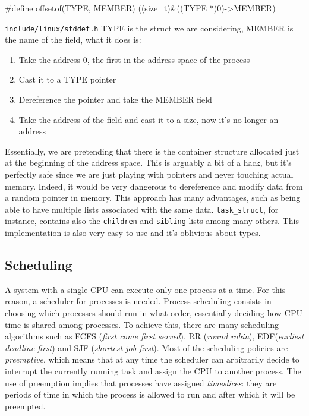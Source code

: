 \documentclass[10pt]{book}
\begin{document}
\begin{code}
#define offsetof(TYPE, MEMBER) ((size_t)&((TYPE *)0)->MEMBER)
\end{code}
\verb|include/linux/stddef.h|
TYPE is the struct we are considering, MEMBER is the name of the field, what it does is:
\begin{enumerate}
    \item Take the address 0, the first in the address space of the process
    \item Cast it to a TYPE pointer 
    \item Dereference the pointer and take the MEMBER field
    \item Take the address of the field and cast it to a size, now it's no longer an address
\end{enumerate}
Essentially, we are pretending that there is the container structure allocated just at the beginning of the address space. This is arguably a bit of a hack, but it's perfectly safe since we are just playing with pointers and never touching actual memory. Indeed, it would be very dangerous to dereference and modify data from a random pointer in memory. This approach has many advantages, such as being able to have multiple lists associated with the same data. \verb|task_struct|, for instance, contains also the \verb|children| and \verb|sibling| lists among many others. This implementation is also very easy to use and it's oblivious about types.

\subsection{Scheduling} 
\label{sec:scheduling}
A system with a single CPU can execute only one process at a time. For this reason, a scheduler for processes is needed. Process scheduling consists in choosing which processes should run in what order, essentially deciding how CPU time is shared among processes. To achieve this, there are many scheduling algorithms such as FCFS (\textit{first come first served}), RR (\textit{round robin}), EDF(\textit{earliest deadline first}) and SJF (\textit{shortest job first}). Most of the scheduling policies are \textit{preemptive}, which means that at any time the scheduler can arbitrarily decide to interrupt the currently running task and assign the CPU to another process. The use of preemption implies that processes have assigned \textit{timeslices}: they are periods of time in which the process is allowed to run and after which it will be preempted. 
\end{document}
